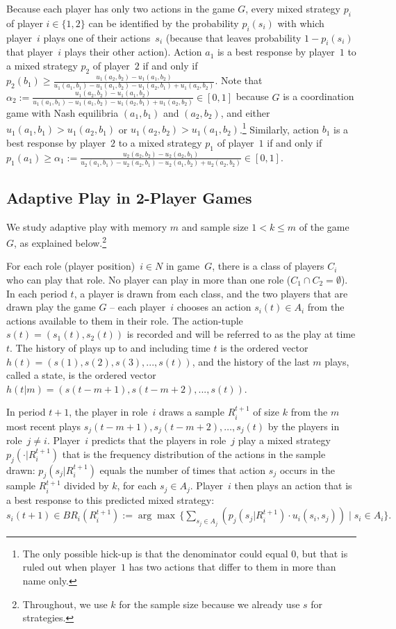 Because each player has only two actions in the game $G$, every mixed strategy $p_i$ of player $i\in \{1,2\}$ can be identified by the probability $p_i(s_i)$ with which player~$i$ plays one of their actions~$s_i$ (because that leaves probability $1-p_i(s_i)$ that player~$i$ plays their other action). 
%
Action $a_1$ is a best response by player~$1$ to a mixed strategy $p_2$ of player~$2$ if and only if 
$p_2(b_1) \geq \frac{u_1(a_2,b_2)-u_1(a_1,b_2)}{u_1(a_1,b_1)-u_1(a_1,b_2)-u_1(a_2,b_1)+u_1(a_2,b_2)}.$ Note that $\alpha_2 :=\frac{u_1(a_2,b_2)-u_1(a_1,b_2)}{u_1(a_1,b_1)-u_1(a_1,b_2)-u_1(a_2,b_1)+u_1(a_2,b_2)}\in [0,1]$ because $G$ is a coordination game with Nash equilibria $(a_1,b_1)$ and $(a_2,b_2)$, and either $u_1(a_1,b_1) > u_1(a_2,b_1)$ or $u_1(a_2,b_2) > u_1(a_1,b_2)$.\footnote{The only possible hick-up is that the denominator could equal 0, but that is ruled out when player~$1$ has two actions that differ to them in more than name only.}
%
Similarly, action $b_1$ is a best response by player~$2$ to a mixed strategy $p_1$ of player~$1$ if and only if 
$p_1(a_1) \geq \alpha_1 := \frac{u_2(a_2,b_2)-u_2(a_2,b_1)}{u_2(a_1,b_1)-u_2(a_2,b_1)-u_2(a_1,b_2)+u_2(a_2,b_2)} \in [0,1]$.


\subsection{Adaptive Play in 2-Player Games}
 
We study adaptive play \citep{young1993evolution} with memory $m$ and sample size $1<k\leq m$ of the game~$G$, as explained below.\footnote{Throughout, we use $k$ for the sample size because we already use $s$ for strategies.} 

For each role (player position)~$i\in N$ in game~$G$, there is a class of players $C_i$ who can play that role. No player can play in more than one role ($C_1\cap C_2=\emptyset$). 
In each period $t$, a player is drawn from each class, and the two players that are drawn play the game $G$ -- each player~$i$ chooses an action $s_i(t)\in A_i$ from the actions available to them in their role. 
The action-tuple $s(t) = (s_1(t), s_2(t))$ is recorded and will be referred to as the play at time $t$. 
The history of plays up to and including time $t$ is the ordered vector $h(t) = (s(1), s(2), s(3), ..., s(t))$, and the history of the last $m$ plays, called a state, is the ordered vector $h(t|m) = (s(t-m+1), s(t-m+2), ..., s(t))$.

In period $t+1$, the player in role~$i$ draws a sample $R_i^{t+1}$ of size $k$ from the $m$ most recent plays $s_j(t-m+1), s_j(t-m+2), \ldots, s_j(t)$ by the players in role~$j\neq i$. 
Player~$i$ predicts that the players in role~$j$ play a mixed strategy $p_j(\cdot | R_i^{t+1})$ that is the frequency distribution of the actions in the sample drawn: $p_j(s_j | R_i^{t+1})$ equals the number of times that action $s_j$ occurs in the sample $R_i^{t+1}$ divided by $k$, for each $s_j\in A_j$. 
%
Player~$i$ then plays an action that is a best response to this predicted mixed strategy:  
$s_i(t+1)\in BR_i(R_i^{t+1}):=\arg\max \,\{ \sum_{s_j\in A_j} \left( p_j(s_j | R_i^{t+1})\cdot u_i(s_i,s_j) \right) \mid s_i\in A_i \} .$


